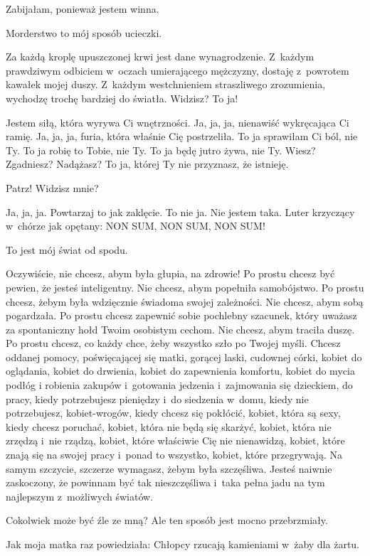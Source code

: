 \documentclass[oneside,polish,12pt,sfheadings]{mwbk}
\begin{document}
Zabijałam, ponieważ jestem winna.

Morderstwo to mój sposób ucieczki.

Za każdą kroplę upuszczonej krwi jest dane wynagrodzenie. Z~każdym
prawdziwym odbiciem w~oczach umierającego mężczyzny, dostaję z~powrotem
kawałek mojej duszy. Z~każdym westchnieniem straszliwego zrozumienia,
wychodzę trochę bardziej do światła. Widzisz? To ja!

Jestem siłą, która wyrywa Ci wnętrzności. Ja, ja, ja, nienawiść wykręcająca
Ci ramię. Ja, ja, ja, furia, która właśnie Cię postrzeliła. To ja
sprawiłam Ci ból, nie Ty. To ja robię to Tobie, nie Ty. To ja będę
jutro żywa, nie Ty. Wiesz? Zgadniesz? Nadążasz? To ja, której Ty nie
przyznasz, że istnieję.

Patrz! Widzisz mnie?

Ja, ja, ja. Powtarzaj to jak zaklęcie. To nie ja. Nie jestem taka.
Luter krzyczący w~chórze jak opętany: NON SUM, NON SUM, NON SUM!

To jest mój świat od spodu.

Oczywiście, nie chcesz, abym była głupia, na zdrowie! Po prostu chcesz
być pewien, że jesteś inteligentny. Nie chcesz, abym popełniła samobójstwo.
Po prostu chcesz, żebym była wdzięcznie świadoma swojej zależności.
Nie chcesz, abym sobą pogardzała. Po prostu chcesz zapewnić sobie
pochlebny szacunek, który uważasz za spontaniczny hołd Twoim osobistym
cechom. Nie chcesz, abym traciła duszę. Po prostu chcesz, co każdy
chce, żeby wszystko szło po Twojej myśli. Chcesz oddanej pomocy, poświęcającej
się matki, gorącej laski, cudownej córki, kobiet do oglądania, kobiet
do drwienia, kobiet do zapewnienia komfortu, kobiet do mycia podłóg
i robienia zakupów i~gotowania jedzenia i~zajmowania się dzieckiem,
do pracy, kiedy potrzebujesz pieniędzy i~do siedzenia w~domu, kiedy
nie potrzebujesz, kobiet-wrogów, kiedy chcesz się pokłócić, kobiet,
która są sexy, kiedy chcesz poruchać, kobiet, która nie będą się skarżyć,
kobiet, która nie zrzędzą i~nie rządzą, kobiet, które właściwie Cię
nie nienawidzą, kobiet, które znają się na swojej pracy i~ponad to
wszystko, kobiet, które przegrywają. Na samym szczycie, szczerze wymagasz,
żebym była szczęśliwa. Jesteś naiwnie zaskoczony, że powinnam być
tak nieszczęśliwa i~taka pełna jadu na tym najlepszym z~możliwych
światów.

Cokolwiek może być źle ze mną? Ale ten sposób jest mocno przebrzmiały.

Jak moja matka raz powiedziała: Chłopcy rzucają kamieniami w~żaby
dla żartu.
\end{document}
